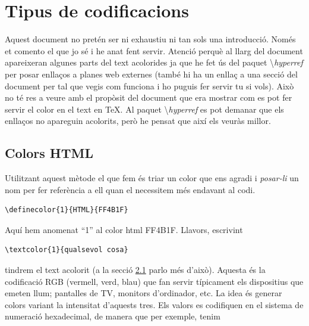 \documentclass[a4paper,12pt]{article}
\begin{document}

    \noindent{}
\bigskip

\section{Tipus de codificacions}

Aquest document no pretén ser ni exhaustiu ni tan sols una introducció. Només et comento el que jo sé i he anat fent servir. Atenció perquè al llarg del document apareixeran algunes parts del text acolorides ja que he fet ús del paquet \textbackslash\emph{hyperref} per posar enllaços a planes web externes (també hi ha un enllaç a una secció del document per tal que vegis com funciona i ho puguis fer servir tu si vols). Això no té res a veure amb el propòsit del document que era mostrar com es pot fer servir el color en el text en TeX. Al paquet \textbackslash\emph{hyperref} es pot demanar que els enllaços no apareguin acolorits, però he pensat que així els veuràs millor. 
\subsection{Colors HTML}
Utilitzant aquest mètode el que fem és triar un color que ens agradi i \emph{posar-li} un nom per fer referència a ell quan el necessitem més endavant al codi. 

\begin{verbatim}
\definecolor{1}{HTML}{FF4B1F}
\end{verbatim}

Aquí hem anomenat ``1'' al color html FF4B1F. Llavors, escrivint 

\begin{verbatim}
\textcolor{1}{qualsevol cosa}
\end{verbatim}

tindrem el text acolorit (a la secció \hyperref[sec:us]{2.1} parlo més d'això).
Aquesta és la codificació RGB (vermell, verd, blau) que fan servir típicament els dispositius que emeten llum; pantalles de TV, monitors d'ordinador, etc. La idea és generar colors variant la intensitat d'aquests tres. Els valors es codifiquen en el sistema de numeració hexadecimal, de manera que per exemple, tenim
\end{document}
